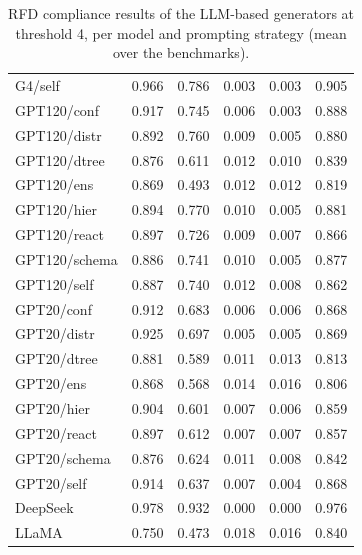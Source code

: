 \begin{table}[t]
\begin{tabular}{lrrrrr}
G4/self & 0.966 & 0.786 & 0.003 & 0.003 & 0.905 \\
GPT120/conf & 0.917 & 0.745 & 0.006 & 0.003 & 0.888 \\
GPT120/distr & 0.892 & 0.760 & 0.009 & 0.005 & 0.880 \\
GPT120/dtree & 0.876 & 0.611 & 0.012 & 0.010 & 0.839 \\
GPT120/ens & 0.869 & 0.493 & 0.012 & 0.012 & 0.819 \\
GPT120/hier & 0.894 & 0.770 & 0.010 & 0.005 & 0.881 \\
GPT120/react & 0.897 & 0.726 & 0.009 & 0.007 & 0.866 \\
GPT120/schema & 0.886 & 0.741 & 0.010 & 0.005 & 0.877 \\
GPT120/self & 0.887 & 0.740 & 0.012 & 0.008 & 0.862 \\
GPT20/conf & 0.912 & 0.683 & 0.006 & 0.006 & 0.868 \\
GPT20/distr & 0.925 & 0.697 & 0.005 & 0.005 & 0.869 \\
GPT20/dtree & 0.881 & 0.589 & 0.011 & 0.013 & 0.813 \\
GPT20/ens & 0.868 & 0.568 & 0.014 & 0.016 & 0.806 \\
GPT20/hier & 0.904 & 0.601 & 0.007 & 0.006 & 0.859 \\
GPT20/react & 0.897 & 0.612 & 0.007 & 0.007 & 0.857 \\
GPT20/schema & 0.876 & 0.624 & 0.011 & 0.008 & 0.842 \\
GPT20/self & 0.914 & 0.637 & 0.007 & 0.004 & 0.868 \\
\midrule
DeepSeek & 0.978 & 0.932 & 0.000 & 0.000 & 0.976 \\
LLaMA & 0.750 & 0.473 & 0.018 & 0.016 & 0.840 \\
\bottomrule
\end{tabular}
\caption{RFD compliance results of the LLM-based generators at threshold 4, per model and prompting strategy (mean over the benchmarks).}
\label{tab:rfdcompliance_llm_thr4}
\end{table}